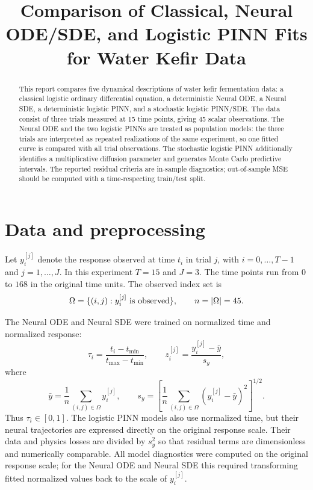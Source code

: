 \documentclass[11pt]{article}
\title{Comparison of Classical, Neural ODE/SDE, and Logistic PINN Fits for Water Kefir Data}
\author{}
\date{}
\begin{document}
\maketitle

\begin{abstract}
    This report compares five dynamical descriptions of water kefir
    fermentation data: a classical logistic ordinary differential equation, a
    deterministic Neural ODE, a Neural SDE, a deterministic logistic PINN, and a
    stochastic logistic PINN/SDE. The data consist of three trials measured at
    15 time points, giving 45 scalar observations. The Neural ODE and the two
    logistic PINNs are treated as population models: the three trials are
    interpreted as repeated realizations of the same experiment, so one fitted
    curve is compared with all trial observations. The stochastic logistic PINN
    additionally identifies a multiplicative diffusion parameter and generates
    Monte Carlo predictive intervals. The reported residual criteria are
    in-sample diagnostics; out-of-sample MSE should be computed with a
    time-respecting train/test split.
\end{abstract}

\section{Data and preprocessing}

        Let $y_i^{[j]}$ denote the response observed at time $t_i$ in trial $j$,
    with $i=0,\ldots,T-1$ and $j=1,\ldots,J$. In this experiment $T=15$ and
    $J=3$. The time points run from $0$ to $168$ in the original time units.
    The observed index set is
    $$
    \Omega = \{(i,j): y_i^{[j]}\ \hbox{is observed}\},
    \qquad n = |\Omega| = 45.
    $$

        The Neural ODE and Neural SDE were trained on normalized time and
    normalized response:
    $$
        \tau_i = \frac{t_i-t_{\min}}{t_{\max}-t_{\min}},
        \qquad
        z_i^{[j]} = \frac{y_i^{[j]}-\bar y}{s_y},
    $$
    where
    $$
        \bar y = \frac{1}{n}\sum_{(i,j)\in\Omega} y_i^{[j]},
        \qquad
        s_y =
            \left[
                \frac{1}{n}\sum_{(i,j)\in\Omega}(y_i^{[j]}-\bar y)^2
            \right]^{1/2}.
    $$
    Thus $\tau_i\in[0,1]$. The logistic PINN models also use normalized time,
    but their neural trajectories are expressed directly on the original
    response scale. Their data and physics losses are divided by $s_y^2$ so
    that residual terms are dimensionless and numerically comparable. All model
    diagnostics were computed on the original response scale; for the Neural
    ODE and Neural SDE this required transforming fitted normalized values back
    to the scale of $y_i^{[j]}$.
\end{document}
